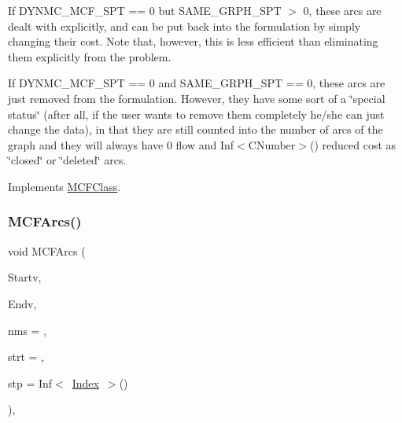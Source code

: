 If D\+Y\+N\+M\+C\+\_\+\+M\+C\+F\+\_\+\+S\+PT == 0 but S\+A\+M\+E\+\_\+\+G\+R\+P\+H\+\_\+\+S\+PT $>$ 0, these arcs are dealt with explicitly, and can be put back into the formulation by simply changing their cost. Note that, however, this is less efficient than eliminating them explicitly from the problem.

If D\+Y\+N\+M\+C\+\_\+\+M\+C\+F\+\_\+\+S\+PT == 0 and S\+A\+M\+E\+\_\+\+G\+R\+P\+H\+\_\+\+S\+PT == 0, these arcs are just removed from the formulation. However, they have some sort of a \char`\"{}special status\char`\"{} (after all, if the user wants to remove them completely he/she can just change the data), in that they are still counted into the number of arcs of the graph and they will always have 0 flow and Inf$<$\+C\+Number$>$() reduced cost as \char`\"{}closed\char`\"{} or \char`\"{}deleted\char`\"{} arcs. 

Implements \mbox{\hyperlink{class_m_c_f_class_a8d82d26f7845eb69081c860e14c3dc4c}{M\+C\+F\+Class}}.

\mbox{\label{class_s_p_tree_a616a201fc11126e95b77f76aac2e110e}} 
\subsubsection{\texorpdfstring{M\+C\+F\+Arcs()}{MCFArcs()}}
{\footnotesize\ttfamily void M\+C\+F\+Arcs (\begin{DoxyParamCaption}\item[{\mbox{\hyperlink{class_m_c_f_class_ace3388eb329ff0551a0b86b6c67e33d8}{Index\+\_\+\+Set}}}]{Startv,  }\item[{\mbox{\hyperlink{class_m_c_f_class_ace3388eb329ff0551a0b86b6c67e33d8}{Index\+\_\+\+Set}}}]{Endv,  }\item[{\mbox{\hyperlink{class_m_c_f_class_a81575b2d4e4d5636b17170432150ae69}{c\+Index\+\_\+\+Set}}}]{nms = {},  }\item[{\mbox{\hyperlink{class_m_c_f_class_a76aaabb20535c51a2752b93f6c38fe54}{c\+Index}}}]{strt = {},  }\item[{\mbox{\hyperlink{class_m_c_f_class_ad53d6229d7ec28555a9c9c2fd9abf773}{Index}}}]{stp = {\ttfamily Inf$<$~\mbox{\hyperlink{class_m_c_f_class_ad53d6229d7ec28555a9c9c2fd9abf773}{Index}}~$>$()} }\end{DoxyParamCaption})\hspace{0.3cm}{\ttfamily [override]}, {\ttfamily [virtual]}}

